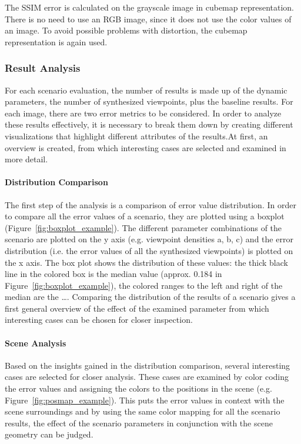 The SSIM error is calculated on the grayscale image in cubemap representation. There is no need to use an RGB image, since it does not use the color values of an image. To avoid possible problems with distortion, the cubemap representation is again used.

\subsubsection{Result Analysis}
For each scenario evaluation, the number of results is made up of the dynamic parameters, the number of synthesized viewpoints, plus the baseline results. For each image, there are two error metrics to be considered.
In order to analyze these results effectively, it is necessary to break them down by creating different visualizations that highlight different attributes of the results.At first, an overview is created, from which interesting cases are selected and examined in more detail.

\paragraph{Distribution Comparison}
The first step of the analysis is a comparison of error value distribution. In order to compare all the error values of a scenario, they are plotted using a boxplot (Figure~\ref{fig:boxplot_example}). The different parameter combinations of the scenario are plotted on the y axis (e.g. viewpoint densities a, b, c) and the error distribution (i.e. the error values of all the synthesized viewpoints) is plotted on the x axis. The box plot shows the distribution of these values: the thick black line in the colored box is the median value (approx. 0.184 in Figure~\ref{fig:boxplot_example}), the colored ranges to the left and right of the median are the \ldots {}. Comparing the distribution of the results of a scenario gives a first general overview of the effect of the examined parameter from which interesting cases can be chosen for closer inspection.

\paragraph{Scene Analysis}
Based on the insights gained in the distribution comparison, several interesting cases are selected for closer analysis. These cases are examined by color coding the error values and assigning the colors to the positions in the scene (e.g. Figure~\ref{fig:posmap_example}). This puts the error values in context with the scene surroundings and by using the same color mapping for all the scenario results, the effect of the scenario parameters in conjunction with the scene geometry can be judged.

